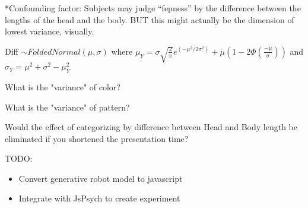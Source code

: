 \documentclass[12pt]{article}
\begin{document}
\vspace{0.2in}

\noindent **Confounding factor: Subjects may judge ``fepness'' by the difference between the lengths of the head and the body. BUT this might actually be the dimension of lowest variance, visually.

\vspace{0.2in}

\noindent Diff $\sim FoldedNormal(\mu,\sigma)$ where $\mu_Y = \sigma \sqrt{\frac{2}{\pi}}e^{(-\mu^2/2\sigma^2)} + \mu (1-2\Phi(\frac{-\mu}{\sigma}))$ and $\sigma_Y = \mu^2 + \sigma^2 - \mu_Y ^2$

\noindent What is the "variance" of color?

\noindent What is the "variance" of pattern?

\noindent Would the effect of categorizing by difference between Head and Body length be eliminated if you shortened the presentation time?

\vspace{0.5in}
\noindent TODO:
\begin{itemize}
	\item Convert generative robot model to javascript
	\item Integrate with JsPsych to create experiment
\end{itemize}
\end{document}
